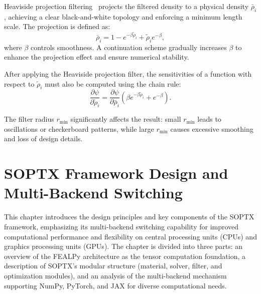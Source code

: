 \documentclass[mathpazo]{cicp}
\begin{document}
Heaviside projection filtering~\cite{guest2004achieving} projects the filtered density to a physical density $\bar{\rho}_i$, achieving a clear black-and-white topology and enforcing a minimum length scale. The projection is defined as:
\begin{equation*}
	\bar\rho_i= 1 - e^{-\beta\tilde\rho_i} + \tilde\rho_ie^{-\beta},
\end{equation*}
where $\beta$ controls smoothness. A continuation scheme gradually increases $\beta$ to enhance the projection effect and ensure numerical stability.

After applying the Heaviside projection filter, the sensitivities of a function with respect to $\tilde\rho_i$ must also be computed using the chain rule:
\begin{equation*}
	\frac{\partial\psi}{\partial\tilde\rho_i} = \frac{\partial\psi}{\partial\bar\rho_i}(\beta{e}^{-\beta\tilde\rho_i} + e^{-\beta}).
\end{equation*}

The filter radius $r_{\min}$ significantly affects the result: small $r_{\min}$ leads to oscillations or checkerboard patterns, while large $r_{\min}$ causes excessive smoothing and loss of design details.

\section{SOPTX Framework Design and Multi-Backend Switching}
This chapter introduces the design principles and key components of the SOPTX framework, emphasizing its multi-backend switching capability for improved computational performance and flexibility on central processing units (CPUs) and graphics processing units (GPUs). The chapter is divided into three parts: an overview of the FEALPy architecture as the tensor computation foundation, a description of SOPTX’s modular structure (material, solver, filter, and optimization modules), and an analysis of the multi-backend mechanism supporting NumPy, PyTorch, and JAX for diverse computational needs.
\end{document}
